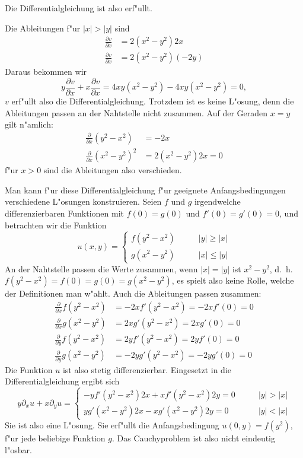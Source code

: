 {\begin{loesung}
\begin{teilaufgaben}
Die Differentialgleichung ist also erf"ullt.
\item
Die Ableitungen f"ur $|x|>|y|$ sind
\begin{align*}
\frac{\partial v}{\partial x}
&=2(x^2-y^2)2x\\
\frac{\partial v}{\partial x}
&=2(x^2-y^2)(-2y)
\end{align*}
Daraus bekommen wir
\[
y\frac{\partial v}{\partial x}
+
x \frac{\partial v}{\partial x}
=
4xy(x^2-y^2)
-4xy(x^2-y^2)=0,
\]
$v$ erf"ullt also die Differentialgleichung.
Trotzdem ist es keine
L"osung, denn die Ableitungen passen an der Nahtstelle nicht zusammen.
Auf der Geraden $x=y$ gilt n"amlich:
\begin{align*}
\frac{\partial}{\partial x}(y^2-x^2)&=-2x\\
\frac{\partial}{\partial x}(x^2-y^2)^2&=2(x^2-y^2)2x=0
\end{align*}
f"ur $x>0$ sind die Ableitungen also verschieden.
\end{teilaufgaben}

Man kann f"ur diese Differentialgleichung f"ur geeignete Anfangsbedingungen
verschiedene L"osungen konstruieren. Seien $f$ und $g$ irgendwelche
differenzierbaren Funktionen mit $f(0)=g(0)$ und $f'(0)=g'(0)=0$,
und betrachten wir die Funktion
\[
u(x,y)=\begin{cases}
f(y^2-x^2)&\qquad |y|\ge|x|\\
g(x^2-y^2)&\qquad |x|\le|y|
\end{cases}
\]
An der Nahtstelle passen die Werte zusammen, wenn $|x|=|y|$ ist $x^2-y^2$,
d.~h.~$f(y^2-x^2)=f(0)=g(0)=g(x^2-y^2)$, es spielt also keine Rolle, welche
der Definitionen man w"ahlt.
Auch die Ableitungen passen zusammen:
\begin{align*}
\frac{\partial}{\partial x}f(y^2-x^2)&=-2xf'(y^2-x^2)=-2xf'(0)=0
\\
\frac{\partial}{\partial x}g(x^2-y^2)&=2xg'(y^2-x^2)=2xg'(0)=0
\\
\frac{\partial}{\partial y}f(y^2-x^2)&=2yf'(y^2-x^2)=2yf'(0)=0
\\
\frac{\partial}{\partial y}g(x^2-y^2)&=-2yg'(y^2-x^2)=-2yg'(0)=0
\end{align*}
Die Funktion $u$ ist also stetig differenzierbar.
Eingesetzt in die Differentialgleichung ergibt sich
\[
y\partial_xu+x\partial_yu
=
\begin{cases}
-yf'(y^2-x^2)2x+xf'(y^2-x^2)2y=0&\qquad |y|>|x|\\
yg'(x^2-y^2)2x-xg'(x^2-y^2)2y=0&\qquad |y|<|x|
\end{cases}
\]
Sie ist also eine L"osung. Sie erf"ullt die Anfangsbedingung
$u(0,y)=f(y^2)$, f"ur jede beliebige Funktion $g$. Das Cauchyproblem
ist also nicht eindeutig l"osbar.


\end{loesung}}
